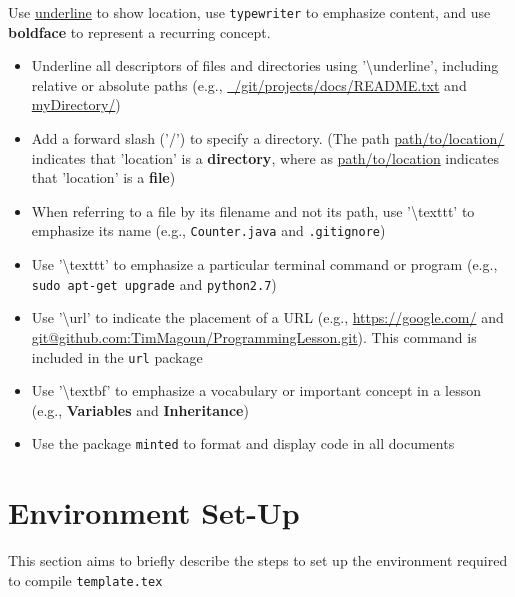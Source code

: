 \documentclass[11pt,fleqn]{article}
\begin{document}
	\quad Use \underline{underline} to show location, use \texttt{typewriter} to emphasize content, and use \textbf{boldface} to represent a recurring concept.

\begin{itemize}
	\item Underline all descriptors of files and directories using '\textbackslash{}underline', including relative or absolute paths (e.g., \underline{~/git/projects/docs/README.txt} and \underline{myDirectory/})

	\item Add a forward slash ('/') to specify a directory. (The path \underline{path/to/location/} indicates that 'location' is a \textbf{directory}, where as \underline{path/to/location} indicates that 'location' is a \textbf{file})

	\item When referring to a file by its filename and not its path, use '\textbackslash{}texttt' to emphasize its name (e.g., \texttt{Counter.java} and \texttt{.gitignore})

	\item Use '\textbackslash{}texttt' to emphasize a particular terminal command or program (e.g., \texttt{sudo apt-get upgrade} and \texttt{python2.7})

	\item Use '\textbackslash{}url' to indicate the placement of a URL (e.g., \url{https://google.com/} and \url{git@github.com:TimMagoun/ProgrammingLesson.git}). This command is included in the \texttt{url} package

	\item Use '\textbackslash{}textbf' to emphasize a vocabulary or important concept in a lesson (e.g., \textbf{Variables} and \textbf{Inheritance})

	\item Use the package \texttt{minted} to format and display code in all documents
\end{itemize}

\section*{Environment Set-Up}
This section aims to briefly describe the steps to set up the environment required to compile
\texttt{template.tex}
\end{document}
